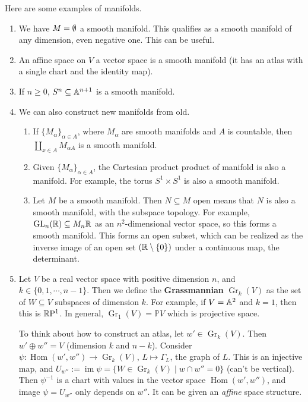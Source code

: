 \begin{example}
    Here are some examples of manifolds.
    \begin{enumerate}[label=(\arabic*)]
        \item We have $M= \emptyset$ a smooth manifold. This qualifies as a smooth manifold of any dimension, even negative one. This can be useful.
        \item An affine space on $V$ a vector space is a smooth manifold (it has an atlas with a single chart and the identity map).
        \item If $n\geq 0$, $S^n  \subseteq \mathbb{A}^{n+1}$ is a smooth manifold.
        \item We can also construct new manifolds from old.
            \begin{enumerate}
                \item If $\{ M_{\alpha }\} _{\alpha \in A}$, where $M_{\alpha }$ are smooth manifolds and $A$ is countable, then $\coprod _{x\in A} M _{\alpha A}$ is a smooth manifold.
                \item Given $\{M_{\alpha }\} _{\alpha \in A}$, the Cartesian product product of manifold is also a manifold. For example, the torus $S^1  \times  S^1 $ is also a smooth manifold.
                \item Let $M$ be a smooth manifold. Then $N \subseteq M$ open means that $N$ is also a smooth manifold, with the subspace topology. For example, $\operatorname{GL}_n (\mathbb{R}) \subseteq  M_n \mathbb{R}$ as an $n^2$-dimensional vector space, so this forms a smooth manifold. This forms an open subset, which can be realized as the inverse image of an open set $(\mathbb{R} \setminus \{0\} )$ under a continuous map, the determinant.
            \end{enumerate}
        \item Let $V$ be a real vector space with positive dimension $n$, and $k \in \{0,1,\cdots ,n-1\} $. Then we define the \textbf{Grassmannian} $\operatorname{Gr}_k(V)$ as the set of $W \subseteq V$ subspaces of dimension $k$. For example, if $V=\mathbb{A}^2$ and $k=1$, then this is $\mathbb{R} \mathrm P^1$. In general, $\operatorname{Gr}_1(V)=\mathbb P V$ which is projective space. 

            To think about how to construct an atlas, let $w' \in  \operatorname{Gr}_k(V)$. Then $w'\oplus w''=V$ (dimension $k$ and $n-k$). Consider $\psi \colon \operatorname{Hom}(w', w'') \to \operatorname{Gr}_k(V)$, $L \mapsto  \Gamma_L$, the graph of $L.$ This is an injective map, and $U_{w''}:=\operatorname{im}\psi = \{ W \in  \operatorname{Gr}_k(V)  \mid w \cap w''=0\} $ (can't be vertical). Then $\psi ^{-1}$ is a chart with values in the vector space $\operatorname{Hom}(w',w'')$, and image $\psi=U_{w''}$ only depends on $w''$. It can be given an \emph{affine} space structure.


\end{enumerate}
\end{example}

